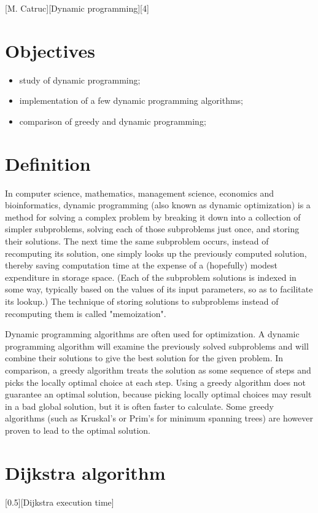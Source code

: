 \documentclass{article}
\begin{document}
	[M. Catruc][Dynamic programming][4]

	\section{Objectives}
		\begin{itemize}
			\item study of dynamic programming;
			\item implementation of a few dynamic programming algorithms;
			\item comparison of greedy and dynamic programming;
		\end{itemize}

	\section{Definition}
		\par In computer science, mathematics, management science, economics and bioinformatics, dynamic programming (also known as dynamic optimization) is a method for solving a complex problem by breaking it down into a collection of simpler subproblems, solving each of those subproblems just once, and storing their solutions. The next time the same subproblem occurs, instead of recomputing its solution, one simply looks up the previously computed solution, thereby saving computation time at the expense of a (hopefully) modest expenditure in storage space. (Each of the subproblem solutions is indexed in some way, typically based on the values of its input parameters, so as to facilitate its lookup.) The technique of storing solutions to subproblems instead of recomputing them is called "memoization".

		\par Dynamic programming algorithms are often used for optimization. A dynamic programming algorithm will examine the previously solved subproblems and will combine their solutions to give the best solution for the given problem. In comparison, a greedy algorithm treats the solution as some sequence of steps and picks the locally optimal choice at each step. Using a greedy algorithm does not guarantee an optimal solution, because picking locally optimal choices may result in a bad global solution, but it is often faster to calculate. Some greedy algorithms (such as Kruskal's or Prim's for minimum spanning trees) are however proven to lead to the optimal solution.

	\section{Dijkstra algorithm}
		[0.5][Dijkstra execution time]
\end{document}
